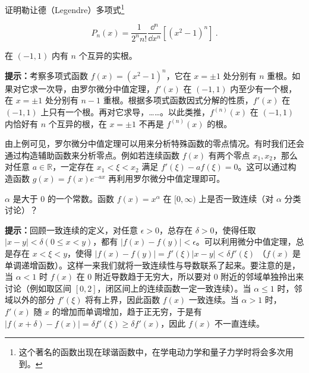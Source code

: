 \begin{exercise}{}
证明勒让德（Legendre）多项式\footnote{这个著名的函数出现在球谐函数中，在学电动力学和量子力学时将会多次用到。}

\begin{equation}
P_n(x)=\frac{1}{2^n n!}\frac{\dd{} ^n}{\dd x^n}[(x^2-1)^n]~.
\end{equation}

在 $(-1,1)$ 内有 $n$ 个互异的实根。

\textbf{提示：}考察多项式函数 $f(x)=(x^2-1)^n$，它在 $x=\pm 1$ 处分别有 $n$ 重根。如果对它求一次导，由罗尔微分中值定理，$f'(x)$ 在 $(-1,1)$ 内至少有一个根，在 $x=\pm 1$ 处分别有 $n-1$ 重根。根据多项式函数因式分解的性质，$f'(x)$ 在 $(-1,1)$ 上只有一个根。再对它求导，……。以此类推，$f^{(n)}(x)$ 在 $(-1,1)$ 内恰好有 $n$ 个互异的根，在 $x=\pm 1$ 不再是 $f^{(n)}(x)$ 的根。
\end{exercise}
由上例可见，罗尔微分中值定理可以用来分析特殊函数的零点情况。有时我们还会通过构造辅助函数来分析零点。例如若连续函数 $f(x)$ 有两个零点 $x_1,x_2$，那么对任意 $a\in \mathbb{R}$，一定存在 $x_1<\xi<x_2$ 满足 $f'(\xi)-af(\xi)=0$。这可以通过构造函数 $g(x)=f(x)e^{-ax}$ 再利用罗尔微分中值定理即可。

\begin{exercise}{}
$\alpha$ 是大于 $0$ 的一个常数。函数 $f(x)=x^\alpha$ 在 $[0,\infty)$ 上是否一致连续（对 $\alpha$ 分类讨论）？

\textbf{提示：}回顾一致连续的定义，对任意 $\epsilon>0$，总存在 $\delta>0$，使得任取 $|x-y|<\delta(0\le x<y)$，都有 $|f(x)-f(y)|<\epsilon$。可以利用微分中值定理，总是存在 $x< \xi <y$，使得 $|f(x)-f(y)|=f'(\xi)|x-y|<\delta f'(\xi)$ （$f(x)$ 是单调递增函数）。这样一来我们就将一致连续性与导数联系了起来。要注意的是，当 $\alpha<1$ 时 $f(x)$ 在 $0$ 附近导数趋于无穷大，所以要对 $0$ 附近的邻域单独拎出来讨论（例如取区间 $[0,2]$，闭区间上的连续函数一定一致连续）。当 $\alpha\le1$ 时，邻域以外的部分 $f'(\xi)$ 将有上界，因此函数 $f(x)$ 一致连续。当 $\alpha>1$ 时，$f'(x)$ 随 $x$ 的增加而单调增加，趋于正无穷，于是有 $|f(x+\delta)-f(x)|=\delta f'(\xi) \ge\delta f'(x)$，因此 $f(x)$ 不一直连续。
\end{exercise}

